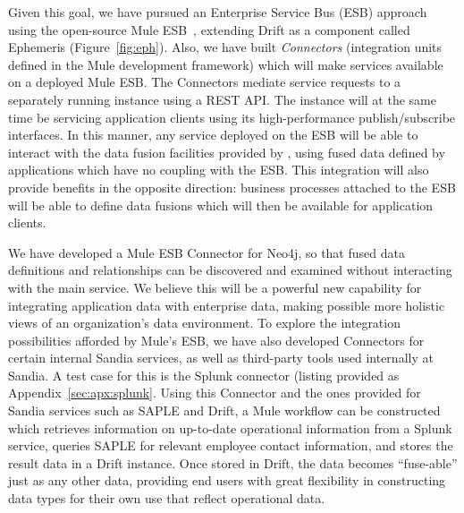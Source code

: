 Given this goal, we have pursued an Enterprise Service Bus (ESB) approach using the open-source Mule
ESB~\cite{mule-esb}, extending Drift as a component called Ephemeris\cite{enterprise14:_patric_m} (Figure~\ref{fig:eph}).  Also, we have built \emph{Connectors} (integration units defined in the Mule
development framework) which will make \eph services available on a deployed Mule ESB.  The Connectors
mediate service requests to a separately running instance using a REST API.  The \eph instance will at
the same time be servicing application clients using its high-performance publish/subscribe interfaces.
In this manner, any service deployed on the ESB will be able to interact with the data fusion facilities
provided by \eph, using fused data defined by applications which have no coupling with the ESB.  This
integration will also provide benefits in the opposite direction: business processes attached to the ESB
will be able to define data fusions which will then be available for \eph application clients.

We have developed a Mule ESB Connector for Neo4j, so that fused data definitions and relationships can be
discovered and examined without interacting with the main service.  We believe this will be a powerful
new capability for integrating application data with enterprise data, making possible more holistic views
of an organization's data environment.  To explore the integration possibilities afforded by Mule's ESB,
we have also developed Connectors for certain internal Sandia services, as well as third-party tools used
internally at Sandia.  A test case for this is the Splunk connector (listing provided as
Appendix~\ref{sec:apx:splunk}.  Using this Connector and the ones provided for Sandia services such as
SAPLE and Drift, a Mule workflow can be constructed which retrieves information on up-to-date operational
information from a Splunk service, queries SAPLE for relevant employee contact information, and stores
the result data in a Drift instance.  Once stored in Drift, the data becomes ``fuse-able'' just as
any other data, providing end users with great flexibility in constructing data types for their own use
that reflect operational data.  



